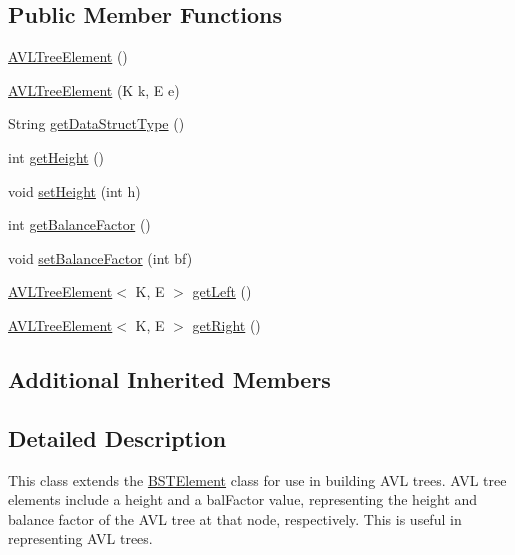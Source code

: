 \subsection*{Public Member Functions}
\begin{DoxyCompactItemize}
\item 
\hyperlink{classbridges_1_1base_1_1_a_v_l_tree_element_a8fe4490d3d5d16991736bd1a7243b904}{A\+V\+L\+Tree\+Element} ()
\item 
\hyperlink{classbridges_1_1base_1_1_a_v_l_tree_element_a060ec94b52675313ad15388e3f292df5}{A\+V\+L\+Tree\+Element} (K k, E e)
\item 
String \hyperlink{classbridges_1_1base_1_1_a_v_l_tree_element_abdd9e63de10732ef46bd5d531bd7f9d8}{get\+Data\+Struct\+Type} ()
\item 
int \hyperlink{classbridges_1_1base_1_1_a_v_l_tree_element_a52fe2886334c841547d238db69022697}{get\+Height} ()
\item 
void \hyperlink{classbridges_1_1base_1_1_a_v_l_tree_element_ac42b744989ed7e18dcbd52980e674b33}{set\+Height} (int h)
\item 
int \hyperlink{classbridges_1_1base_1_1_a_v_l_tree_element_a0478ca0351cd714e8f7b8e49703990c8}{get\+Balance\+Factor} ()
\item 
void \hyperlink{classbridges_1_1base_1_1_a_v_l_tree_element_a0dc3c83e750cc39535afb08ea92f6c98}{set\+Balance\+Factor} (int bf)
\item 
\hyperlink{classbridges_1_1base_1_1_a_v_l_tree_element}{A\+V\+L\+Tree\+Element}$<$ K, E $>$ \hyperlink{classbridges_1_1base_1_1_a_v_l_tree_element_a86f1329b19d2886ba7bf713e3844ecd6}{get\+Left} ()
\item 
\hyperlink{classbridges_1_1base_1_1_a_v_l_tree_element}{A\+V\+L\+Tree\+Element}$<$ K, E $>$ \hyperlink{classbridges_1_1base_1_1_a_v_l_tree_element_aab93418ac19605f2c7c57aa38d110921}{get\+Right} ()
\end{DoxyCompactItemize}
\subsection*{Additional Inherited Members}


\subsection{Detailed Description}
This class extends the \hyperlink{classbridges_1_1base_1_1_b_s_t_element}{B\+S\+T\+Element} class for use in building A\+V\+L trees. A\+V\+L tree elements include a \textquotesingle{}height\textquotesingle{} and a \textquotesingle{}bal\+Factor\textquotesingle{} value, representing the height and balance factor of the A\+V\+L tree at that node, respectively. This is useful in representing A\+V\+L trees. 


